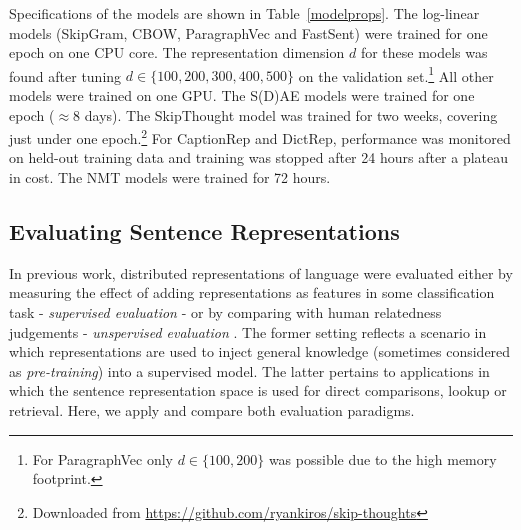 Specifications of the models are shown in Table~\ref{modelprops}. The log-linear models (SkipGram, CBOW, ParagraphVec and FastSent) were trained for one epoch on one CPU core. The representation dimension \(d\) for these models was found after tuning \(d \in \{100,200,300,400,500\}\) on the validation set.\footnote{For ParagraphVec only \(d \in\{100,200\}\) was possible due to the high memory footprint.} All other models were trained on one GPU. The S(D)AE models were trained for one epoch (\(\approx8\) days). The SkipThought model was trained for two weeks, covering just under one epoch.\footnote{Downloaded from {\scriptsize \url{https://github.com/ryankiros/skip-thoughts}}} For CaptionRep and DictRep, performance was monitored on held-out training data and training was stopped after 24 hours after a plateau in cost. The NMT models were trained for 72 hours. 

\subsection{Evaluating Sentence Representations}

In previous work, distributed representations of language were evaluated either by measuring the effect of adding representations as features in some classification task - \emph{supervised evaluation} \cite{collobert2011natural,mikolov2013efficient,kiros2015skip} - or by comparing with human relatedness judgements - \emph{unspervised evaluation} \cite{hill2015learning,baroni2014don,levy2015improving}. The former setting reflects a scenario in which representations are used to inject general knowledge (sometimes considered as \emph{pre-training}) into a supervised model. The latter pertains to applications in which the sentence representation space is used for direct comparisons, lookup or retrieval. Here, we apply and compare both evaluation paradigms.  


